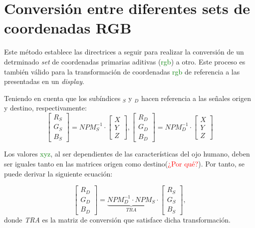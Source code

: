 \documentclass[a4paper, 12pt]{report}
\begin{document}
\section{Conversión entre diferentes sets de coordenadas RGB}
\label{sec:rgbs_to_rgbd}
    Este método establece las directrices a seguir para realizar la conversión de un detrminado \textit{set} de coordenadas primarias aditivas (\textcolor{green}{rgb}) a otro. Este proceso es también válido para la transformación de coordenadas \textcolor{green}{rgb} de referencia a las presentadas en un \textit{display}.
    
    Teniendo en cuenta que los subíndices $_S$ y $_D$ hacen referencia a las señales origen y destino, respectivamente:
        \begin{equation}
        \begin{bmatrix}
                R_S\\
                G_S\\
                B_S
         \end{bmatrix} =
         NPM^{-1}_S\cdot
         \begin{bmatrix}
            X\\
            Y\\
            Z
        \end{bmatrix},  
        \begin{bmatrix}
            R_D\\
            G_D\\
            B_D
        \end{bmatrix} =
         NPM^{-1}_D\cdot
         \begin{bmatrix}
            X\\
            Y\\
            Z
        \end{bmatrix}
    \end{equation}
    
    Los valores \textcolor{green}{xyz}, al ser dependientes de las características del ojo humano, deben ser iguales tanto en las matrices origen como destino(\textcolor{red}{¿Por qué?}). Por tanto, se puede derivar la siguiente ecuación:
    
    \begin{equation}
          \begin{bmatrix}
            R_D\\
            G_D\\
            B_D
          \end{bmatrix} =
          \underbrace{NPM_D^{-1} \cdot NPM_S}_{TRA} \cdot
          \begin{bmatrix}
            R_S\\
            G_S\\
            B_S
          \end{bmatrix},
    \end{equation}
    donde \textit{TRA} es la matriz de conversión que satisface dicha transformación.
\end{document}
